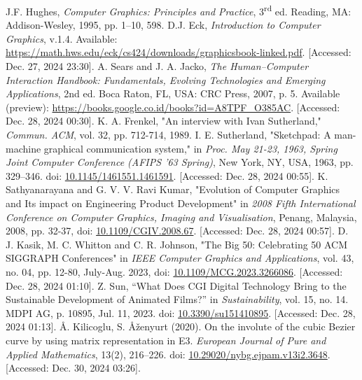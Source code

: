 \documentclass[conference]{IEEEtran}
\begin{document}
\begin{thebibliography}{00}
 J.F. Hughes, \textit{Computer Graphics: Principles and Practice}, 3\textsuperscript{rd} ed. Reading, MA: Addison-Wesley, 1995, pp. 1--10, 598.
 D.J. Eck, \textit{Introduction to Computer Graphics}, v.1.4. Available: \href{https://math.hws.edu/eck/cs424/downloads/graphicsbook-linked.pdf}{https://math.hws.edu/eck/cs424/downloads/graphicsbook-linked.pdf}. [Accessed: Dec. 27, 2024 23:30].
 A. Sears and J. A. Jacko, \textit{The Human–Computer Interaction Handbook: Fundamentals, Evolving Technologies and Emerging Applications}, 2nd ed. Boca Raton, FL, USA: CRC Press, 2007, p. 5. Available (preview): \href{https://books.google.co.id/books?id=A8TPF_O385AC&pg=PA1&hl=id&source=gbs_toc_r&cad=2#v=onepage&q&f=false}{https://books.google.co.id/books?id=A8TPF\_O385AC}. [Accessed: Dec. 28, 2024 00:30].
  K. A. Frenkel, "An interview with Ivan Sutherland," \textit{Commun. ACM}, vol. 32, pp. 712-714, 1989.
 I. E. Sutherland, "Sketchpad: A man-machine graphical communication system," in \textit{Proc. May 21-23, 1963, Spring Joint Computer Conference (AFIPS '63 Spring)}, New York, NY, USA, 1963, pp. 329–346. doi: \href{https://doi.org/10.1145/1461551.1461591}{10.1145/1461551.1461591}. [Accessed: Dec. 28, 2024 00:55].
 K. Sathyanarayana and G. V. V. Ravi Kumar, "Evolution of Computer Graphics and Its impact on Engineering Product Development" in \textit{2008 Fifth International Conference on Computer Graphics, Imaging and Visualisation}, Penang, Malaysia, 2008, pp. 32-37, doi: \href{https://ieeexplore.ieee.org/stamp/stamp.jsp?tp=&arnumber=4626981}{10.1109/CGIV.2008.67}. [Accessed: Dec. 28, 2024 00:57].
 D. J. Kasik, M. C. Whitton and C. R. Johnson, "The Big 50: Celebrating 50 ACM SIGGRAPH Conferences" in \textit{IEEE Computer Graphics and Applications}, vol. 43, no. 04, pp. 12-80, July-Aug. 2023, doi: \href{https://doi.ieeecomputersociety.org/10.1109/MCG.2023.3266086}{10.1109/MCG.2023.3266086}. [Accessed: Dec. 28, 2024 01:10].
 Z. Sun, “What Does CGI Digital Technology Bring to the Sustainable Development of Animated Films?” in \textit{Sustainability}, vol. 15, no. 14. MDPI AG, p. 10895, Jul. 11, 2023. doi: \href{https://www.mdpi.com/2071-1050/15/14/10895}{10.3390/su151410895}. [Accessed: Dec. 28, 2024 01:13].
 Å. Kilicoglu, S. Åženyurt (2020). On the involute of the cubic Bezier curve by using matrix representation in E3. \textit{European Journal of Pure and Applied Mathematics}, 13(2), 216–226. doi: \href{https://doi.org/10.29020/nybg.ejpam.v13i2.3648}{10.29020/nybg.ejpam.v13i2.3648}. [Accessed: Dec. 30, 2024 03:26].

\end{thebibliography}
\end{document}
